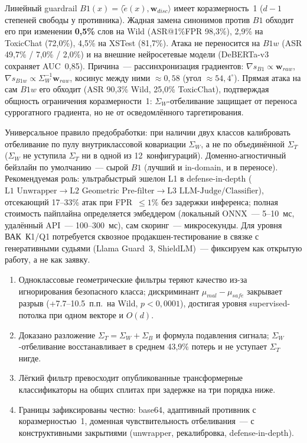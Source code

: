 \documentclass[10pt,a4paper]{article}
\newcommand{\secfmt}[1]{\vspace{5pt}\noindent{\large\bfseries #1}\par\vspace{1.5pt}}
\begin{document}
Линейный guardrail $B1(x)=\langle\tilde{e}(x),\mathbf{w}_{disc}\rangle$ имеет коразмерность~1 ($d-1$ степеней свободы у противника). Жадная замена синонимов против $B1$ обходит его при изменении \textbf{0{,}5\%} слов на Wild (ASR@1\%FPR 98{,}3\%), 2{,}9\% на ToxicChat (72{,}0\%), 4{,}5\% на XSTest (81{,}7\%). Атака не переносится на $B1w$ (ASR 49{,}7\% / 7{,}0\% / 2{,}0\%) и на внешние нейросетевые модели (DeBERTa-v3 сохраняет AUC~0{,}85). Причина~--- рассинхронизация градиентов: $\nabla s_{B1}\propto\mathbf{w}_{raw}$, $\nabla s_{B1w}\propto\Sigma_W^{-1}\mathbf{w}_{raw}$, косинус между ними $\approx0{,}58$ (угол $\approx54{,}4^\circ$). Прямая атака на сам $B1w$ его обходит (ASR 90{,}3\% Wild, 25{,}0\% ToxicChat), подтверждая общность ограничения коразмерности~1: $\Sigma_W$-отбеливание защищает от переноса суррогатного градиента, но не от осведомлённого таргетирования.

\secfmt{7. Обсуждение и рекомендации}

Универсальное правило предобработки: при наличии двух классов калибровать отбеливание по пулу внутриклассовой ковариации $\Sigma_W$, а не по объединённой $\Sigma_T$ ($\Sigma_W$ не уступила $\Sigma_T$ ни в одной из 12~конфигураций). Доменно-агностичный бейзлайн по умолчанию~--- сырой $B1$ (лучший и in-domain, и в переносе). Рекомендуемая роль: ультрабыстрый эшелон L1 в defense-in-depth ($\text{L1 Unwrapper}\to\text{L2 Geometric Pre-filter}\to\text{L3 LLM-Judge/Classifier}$), отсекающий 17--33\% атак при FPR~$\le1\%$ без задержки инференса; полная стоимость пайплайна определяется эмбеддером (локальный ONNX~--- 5--10~мс, удалённый API~--- 100--300~мс), сам скоринг~--- микросекунды. Для уровня ВАК~К1/Q1 потребуется сквозное продакшен-тестирование в связке с генеративными судьями (Llama Guard~3, ShieldLM)~--- фиксируем как открытую работу, а не как заявку.

\secfmt{8. Заключение}

\begin{enumerate}\setlength{\itemsep}{0pt}\setlength{\parsep}{0pt}
\item Одноклассовые геометрические фильтры теряют качество из-за игнорирования безопасного класса; дискриминант $\mu_{mal}-\mu_{safe}$ закрывает разрыв (+7.7--10.5~п.п.\ на Wild, $p<0{,}0001$), достигая уровня supervised-потолка при одном векторе и $O(d)$.
\item Доказано разложение $\Sigma_T=\Sigma_W+\Sigma_B$ и формула подавления сигнала; $\Sigma_W$-отбеливание восстанавливает в среднем 43{,}9\% потерь и не уступает $\Sigma_T$ нигде.
\item Лёгкий фильтр превосходит опубликованные трансформерные классификаторы на общих сплитах при задержке на три порядка ниже.
\item Границы зафиксированы честно: base64, адаптивный противник с коразмерностью~1, доменная чувствительность отбеливания~--- с конструктивными закрытиями (unwrapper, рекалибровка, defense-in-depth).
\end{enumerate}
\end{document}
